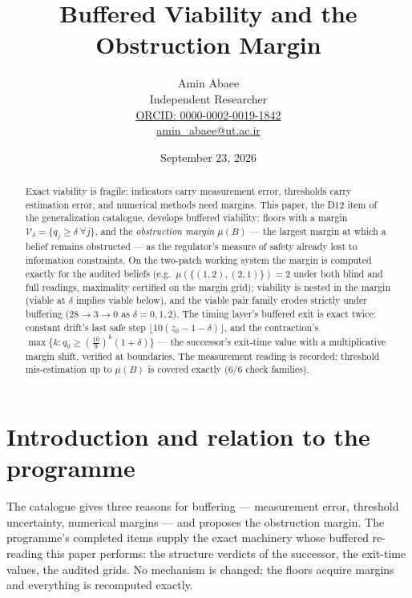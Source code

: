 \documentclass[10pt,twocolumn]{article}
\theoremstyle{definition}
\begin{document}
\title{Buffered Viability and the Obstruction Margin}
\author{Amin Abaee\\[0.35em]
{\small Independent Researcher}\\[0.55em]
{\small\href{https://orcid.org/0000-0002-0019-1842}{ORCID: 0000-0002-0019-1842}}\\[0.3em]
{\small\href{mailto:amin\_abaee@ut.ac.ir}{amin\_abaee@ut.ac.ir}}}
\date{September 23, 2026}
\maketitle

\begin{abstract}
Exact viability is fragile: indicators carry measurement error, thresholds
carry estimation error, and numerical methods need margins. This paper,
the D12 item of the generalization catalogue, develops buffered viability:
floors with a margin $\mathcal V_\delta=\{q_j\ge\delta\ \forall j\}$, and
the \emph{obstruction margin} $\mu(B)$ --- the largest margin at which a
belief remains obstructed --- as the regulator's measure of safety already
lost to information constraints. On the two-patch working system the
margin is computed exactly for the audited beliefs (e.g.\
$\mu(\{(1,2),(2,1)\})=2$ under both blind and full readings, maximality
certified on the margin grid); viability is nested in the margin
(viable at $\delta$ implies viable below), and the viable pair family
erodes strictly under buffering ($28\to3\to0$ as $\delta=0,1,2$). The
timing layer's buffered exit is exact twice: constant drift's last safe
step $\lfloor10(z_0-1-\delta)\rfloor$, and the contraction's
$\max\{k: q_0\ge(\tfrac{10}9)^k(1+\delta)\}$ --- the successor's
exit-time value with a multiplicative margin shift, verified at
boundaries. The measurement reading is recorded: threshold
mis-estimation up to $\mu(B)$ is covered exactly (6/6 check families).
\end{abstract}

\section{Introduction and relation to the programme}

The catalogue gives three reasons for buffering --- measurement error,
threshold uncertainty, numerical margins --- and proposes the obstruction
margin. The programme's completed items supply the exact machinery whose
buffered re-reading this paper performs: the structure verdicts of the
successor, the exit-time values, the audited grids. No mechanism is
changed; the floors acquire margins and everything is recomputed exactly.
\end{document}
